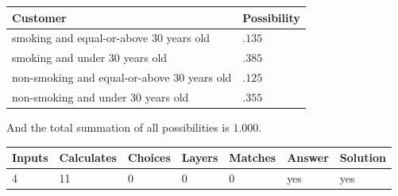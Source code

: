 \documentclass[12pt]{article}
\begin{document}
 

 
\noindent
\begin{tabular}{|l|l|}
\hline
Customer & Possibility \\
\hline
smoking  and  %
equal-or-above 30 years old &
  $ %
.135$ \\
\hline
smoking  and  %
under 30 years old &
  $ %
.385$ \\
\hline
 non-smoking and  %
equal-or-above 30 years old &
  $ %
.125$ \\
\hline
 non-smoking and  %
under 30 years old &
  $ %
.355$ \\
\hline
\end{tabular}
 
\noindent
 And the total summation of all possibilities is $  %
1.000 $.
 
 
 
\noindent{}
 
 

 
\vspace{0.3in}
   
   
   
   
\noindent\begin{tabular}{|l|l|l|l|l|l|l|}
 \hline
Inputs & Calculates & Choices & Layers & Matches & Answer & Solution \\ \hline
           4 & 
          11 & 
           0
  & 
           0 & 
           0 & 
  yes & 
  yes 
  \\ \hline
 \end{tabular}
   
   
   
   
\noindent{}
   
   
  
\end{document}
